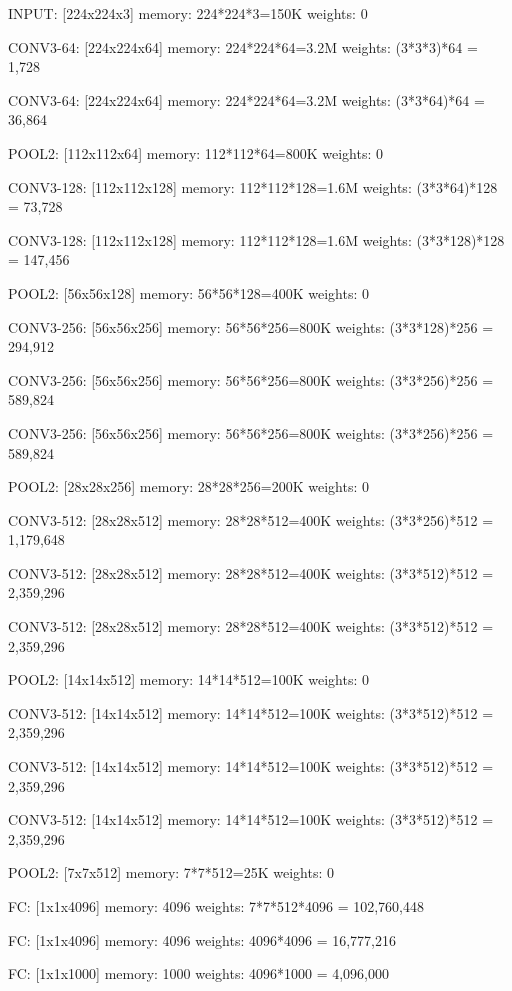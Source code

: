 \documentclass[12pt]{article}
\begin{document}
    \begin{small}
    
\vspace{2mm}INPUT: [224x224x3]        memory:  224*224*3=150K   weights: 0

CONV3-64: [224x224x64]  memory:  224*224*64=3.2M   weights: (3*3*3)*64 = 1,728

CONV3-64: [224x224x64]  memory:  224*224*64=3.2M   weights: (3*3*64)*64 = 36,864

POOL2: [112x112x64]  memory:  112*112*64=800K   weights: 0

CONV3-128: [112x112x128]  memory:  112*112*128=1.6M   weights: (3*3*64)*128 = 73,728

CONV3-128: [112x112x128]  memory:  112*112*128=1.6M   weights: (3*3*128)*128 = 147,456

POOL2: [56x56x128]  memory:  56*56*128=400K   weights: 0

CONV3-256: [56x56x256]  memory:  56*56*256=800K   weights: (3*3*128)*256 = 294,912

CONV3-256: [56x56x256]  memory:  56*56*256=800K   weights: (3*3*256)*256 = 589,824

CONV3-256: [56x56x256]  memory:  56*56*256=800K   weights: (3*3*256)*256 = 589,824

POOL2: [28x28x256]  memory:  28*28*256=200K   weights: 0

CONV3-512: [28x28x512]  memory:  28*28*512=400K   weights: (3*3*256)*512 = 1,179,648

CONV3-512: [28x28x512]  memory:  28*28*512=400K   weights: (3*3*512)*512 = 2,359,296

CONV3-512: [28x28x512]  memory:  28*28*512=400K   weights: (3*3*512)*512 = 2,359,296

POOL2: [14x14x512]  memory:  14*14*512=100K   weights: 0

CONV3-512: [14x14x512]  memory:  14*14*512=100K   weights: (3*3*512)*512 = 2,359,296

CONV3-512: [14x14x512]  memory:  14*14*512=100K   weights: (3*3*512)*512 = 2,359,296

CONV3-512: [14x14x512]  memory:  14*14*512=100K   weights: (3*3*512)*512 = 2,359,296

POOL2: [7x7x512]  memory:  7*7*512=25K  weights: 0

FC: [1x1x4096]  memory:  4096  weights: 7*7*512*4096 = 102,760,448

FC: [1x1x4096]  memory:  4096  weights: 4096*4096 = 16,777,216

FC: [1x1x1000]  memory:  1000 weights: 4096*1000 = 4,096,000 
    
    \end{small}
    
\end{document}
